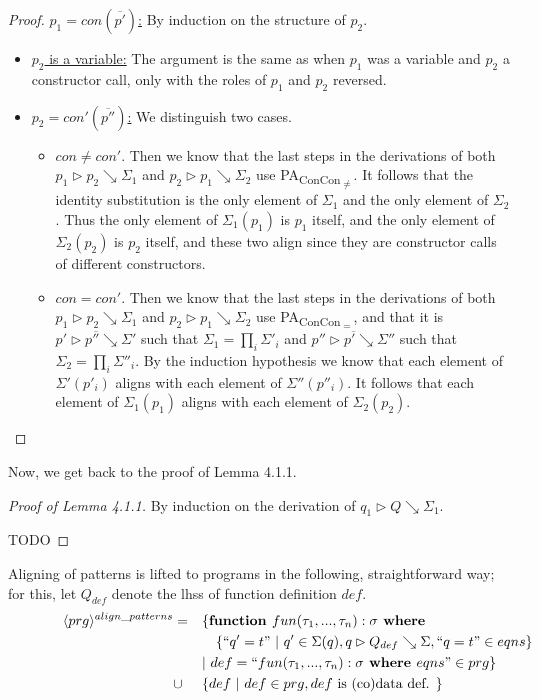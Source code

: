 \begin{lemma}
\begin{proof}
\underline{$p_1 = con(\overline{p'})$:} By induction on the structure of $p_2$.
\begin{itemize}
\item \underline{$p_2$ is a variable:} The argument is the same as when $p_1$ was a variable and $p_2$ a constructor call, only with the roles of $p_1$ and $p_2$ reversed.

\item \underline{$p_2 = con'(\overline{p''})$:} We distinguish two cases.
\begin{itemize}
\item $con \neq con'$. Then we know that the last steps in the derivations of both $p_1 \rhd p_2 \searrow \Sigma_1$ and $p_2 \rhd p_1 \searrow \Sigma_2$ use PA\textsubscript{ConCon\textsubscript{$\neq$}}. It follows that the identity substitution is the only element of $\Sigma_1$ and the only element of $\Sigma_2$. Thus the only element of $\Sigma_1(p_1)$ is $p_1$ itself, and the only element of $\Sigma_2(p_2)$ is $p_2$ itself, and these two align since they are constructor calls of different constructors.

\item $con = con'$. Then we know that the last steps in the derivations of both $p_1 \rhd p_2 \searrow \Sigma_1$ and $p_2 \rhd p_1 \searrow \Sigma_2$ use PA\textsubscript{ConCon\textsubscript{$=$}}, and that it is $\overline{p' \rhd p'' \searrow \Sigma'}$ such that $\Sigma_1 = \prod_i \Sigma'_i$ and $\overline{p'' \rhd p' \searrow \Sigma''}$ such that $\Sigma_2 = \prod_i \Sigma''_i$. By the induction hypothesis we know that each element of $\Sigma'(p'_i)$ aligns with each element of $\Sigma''(p''_i)$. It follows that each element of $\Sigma_1(p_1)$ aligns with each element of $\Sigma_2(p_2)$.
\end{itemize}
\end{itemize}

\end{proof}
\end{lemma} 

Now, we get back to the proof of Lemma 4.1.1.

\begin{proof}[Proof of Lemma 4.1.1]
By induction on the derivation of $q_1 \rhd Q \searrow \Sigma_1$.

TODO
\end{proof}

Aligning of patterns is lifted to programs in the following, straightforward way; for this, let $Q_{def}$ denote the lhss of function definition $def$.
\begin{alignat*}{4}
\langle prg \rangle^{align\_patterns} & = &&\{ \textrm{\textbf{function }} fun(\tau_1, ..., \tau_n): \sigma \textrm{\textbf{ where }} \\
& &&\quad \{ `` q' = t " ~ | ~ q' \in \Sigma(q), q \rhd Q_{def} \searrow \Sigma, `` q = t " \in eqns \} \\
& && | ~ def = `` fun (\tau_1, ..., \tau_n): \sigma \textrm{\textbf{ where }} eqns " \in prg \} \\
& \cup && \{ def ~ | ~ def \in prg, def \textrm{ is (co)data def. } \} \span\span\span\span
\end{alignat*}


